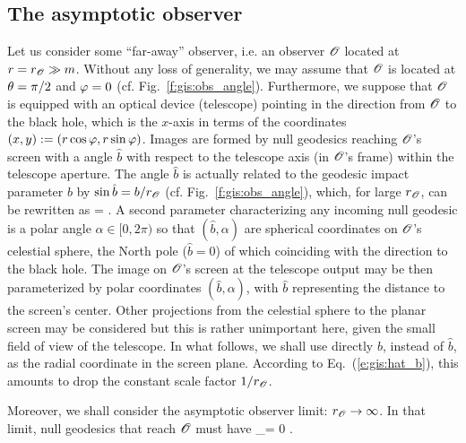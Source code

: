 \subsection{The asymptotic observer}

Let us consider some ``far-away'' observer, i.e. an observer $\mathscr{O}$ located at $r = r_{\mathscr{O}} \gg m$. Without
any loss of generality, we may assume that $\mathscr{O}$ is located at $\theta=\pi/2$ and $\varphi=0$
(cf. Fig.~\ref{f:gis:obs_angle}).
Furthermore, we suppose that $\mathscr{O}$ is
equipped with an optical device (telescope) pointing in the direction from $\mathscr{O}$ to the black hole, which
is the $x$-axis in terms of the coordinates $(x,y):=(r\cos\varphi,r\sin\varphi)$.
Images are formed by null geodesics reaching $\mathscr{O}$'s screen with a angle
$\hat{b}$ with respect to the telescope axis (in $\mathscr{O}$'s frame) within the
telescope aperture. The angle $\hat{b}$ is actually
related to the geodesic impact parameter $b$ by
$\sin\hat{b} = b / r_{\mathscr{O}}$ (cf. Fig.~\ref{f:gis:obs_angle}), which,
for large $r_{\mathscr{O}}$, can be rewritten as
\be \label{e:gis:hat_b}
     =  .
\ee
A second parameter characterizing any incoming null geodesic is a polar
angle $\alpha\in{[0, 2\pi)}$ so that $(\hat{b},\alpha)$ are spherical
coordinates on $\mathscr{O}$'s celestial sphere, the North pole ($\hat{b}=0$) of which
coinciding with the direction to the black hole. The image on $\mathscr{O}$'s screen
at the telescope output may be then parameterized by polar coordinates $(\hat{b}, \alpha)$, with $\hat{b}$ representing the distance to the screen's center.
Other projections from the celestial sphere to the planar screen may be considered
but this is rather unimportant here, given the small field of view of the telescope.
In what follows, we shall use directly $b$, instead of $\hat{b}$, as
the radial coordinate in the screen plane. According to Eq.~(\ref{e:gis:hat_b}),
this amounts to drop the constant
scale factor $1/r_{\mathscr{O}}$.

Moreover, we shall consider the asymptotic observer limit: $r_{\mathscr{O}}\to\infty$.
In that limit, null geodesics that reach $\mathscr{O}$ must have
\be \label{e:gis:ph_inf_0_mod_2pi}
\ph_\infty = 0  \pi .
\ee

